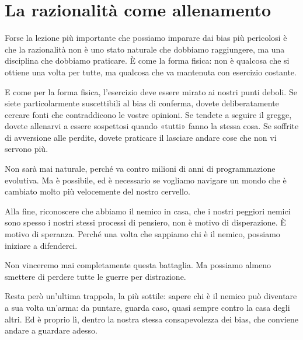 \medskip

\section{La razionalità come allenamento}
\label{sec:p4c8-la-razionalita-come}
Forse la lezione più importante che possiamo imparare dai bias più pericolosi è che la razionalità non è uno stato naturale che dobbiamo raggiungere, ma una disciplina che dobbiamo praticare. È come la forma fisica: non è qualcosa che si ottiene una volta per tutte, ma qualcosa che va mantenuta con esercizio costante.

E come per la forma fisica, l'esercizio deve essere mirato ai nostri punti deboli. Se siete particolarmente suscettibili al bias di conferma, dovete deliberatamente cercare fonti che contraddicono le vostre opinioni. Se tendete a seguire il gregge, dovete allenarvi a essere sospettosi quando «tutti» fanno la stessa cosa. Se soffrite di avversione alle perdite, dovete praticare il lasciare andare cose che non vi servono più.

Non sarà mai naturale, perché va contro milioni di anni di programmazione evolutiva. Ma è possibile, ed è necessario se vogliamo navigare un mondo che è cambiato molto più velocemente del nostro cervello.

Alla fine, riconoscere che abbiamo il nemico in casa, che i nostri peggiori nemici sono spesso i nostri stessi processi di pensiero, non è motivo di disperazione. È motivo di speranza. Perché una volta che sappiamo chi è il nemico, possiamo iniziare a difenderci.

Non vinceremo mai completamente questa battaglia. Ma possiamo almeno smettere di perdere tutte le guerre per distrazione.

Resta però un'ultima trappola, la più sottile: sapere chi è il nemico può diventare a sua volta un'arma: da puntare, guarda caso, quasi sempre contro la casa degli altri. Ed è proprio lì, dentro la nostra stessa consapevolezza dei bias, che conviene andare a guardare adesso.